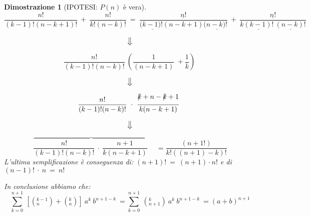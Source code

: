 \documentclass[12pt, a4paper]{article}
\theoremstyle{break}
\theoremstyle{lemma}
\theoremstyle{lemma}
\newtheorem{dimo}{Dimostrazione}
\theoremstyle{lemma}
\begin{document}
\begin{dimo}[IPOTESI: $P(n)$ è vera]
	\begin{equation}
	\frac{n!}{(k-1)!(n-k+1)!}\ +\ \frac{n!}{k!(n-k)!}\ =\
	\frac{\underline{n!}}{(\underline{k-1)!}(n-k+1)(\underline{n-k)!}}\ +\ 
	\frac{\underline{n!}}{k\underline{(k-1)!}\ \underline{(n-k)!}}
	\end{equation}
			
	\begin{equation}
	\big\Downarrow
	\end{equation}
	
	\begin{equation} 
	\frac{n!}{(k-1)!(n-k)!}\ \left( \frac{1}{(n-k+1)}\ + \frac{1}{k} \right)\
	\end{equation}

	\begin{equation}
	\big\Downarrow
	\end{equation}
	

	\begin{equation}
	\frac{n!}{(k-1)!(n-k)!}\ \cdot\ 
	\frac{\xout{k} + n - \xout{k} + 1}{k (n-k+1)}\
	\end{equation}

	\begin{equation}
	\big\Downarrow
	\end{equation}
	
	
	\begin{equation}
	\overbrace{
	\frac{n!}{(k-1)!(n-k)!}\ \cdot\
	\frac{n+1}{k(n-k+1)}\ } \quad =
	\frac{(n+1!)}{k!((n+1)-k)!}
	\end{equation}
L'ultima semplificazione è conseguenza di: $(n+1)!\ =\ (n+1) \cdot n!$
e di $(n-1)!\ \cdot \ n\ =\ n!$

In conclusione abbiamo che:
	\begin{equation}
	\sum_{k=0}^{n+1}\ [(_{n}^{k-1}) + (_{n}^{k})]\ a^{k}\ b^{n+1-k}\ =
	\sum_{k=0}^{n+1}\ (_{n+1}^{k})\ a^{k}\ b^{n+1-k}\ =
	(a + b)^{n+1}
	\end{equation}

\end{dimo}
\end{document}
